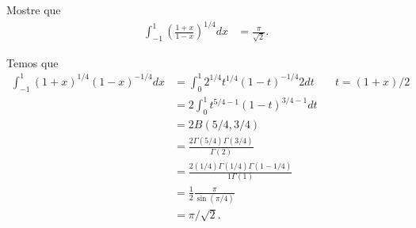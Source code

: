 \documentclass[a4paper,12pt, leqno, answers]{exam}
\begin{document}
\begin{questions}
    \question[E de 2011] Mostre que
    \begin{align*}
        \int_{-1}^1 \left( \frac{1 + x}{1 - x} \right)^{1/4} dx &= \frac{\pi}{\sqrt{2}}.
    \end{align*}
    \begin{solution}
        Temos que
        \begin{align*}
            \int_{-1}^1 (1 + x)^{1/4} (1 - x)^{-1/4} dx &= \int_0^1 2^{1/4} t^{1/4} (1 - t)^{-1/4} 2 dt && t = (1 + x)/2 \\
            &= 2 \int_0^1 t^{5/4 - 1} (1 - t)^{3/4 - 1} dt \\
            &= 2 B(5/4, 3/4) \\
            &= \frac{2 \Gamma(5/4) \Gamma(3/4)}{\Gamma(2)} \\
            &= \frac{2(1/4) \Gamma(1/4) \Gamma(1 - 1/4)}{1 \Gamma(1)} \\
            &= \frac{1}{2} \frac{\pi}{\sin(\pi/4)} \\
            &= \pi / \sqrt{2}.
        \end{align*}
    \end{solution}
\end{questions}
\end{document}
